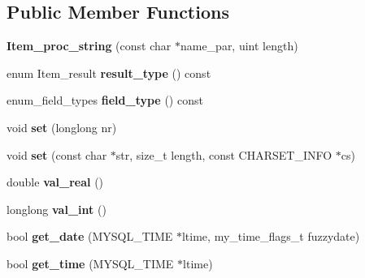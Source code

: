 \subsection*{Public Member Functions}
\begin{DoxyCompactItemize}
\item 
\mbox{\label{classItem__proc__string_a53f206b0a88f7d310efd6a93e84e3e93}} 
{\bfseries Item\+\_\+proc\+\_\+string} (const char $\ast$name\+\_\+par, uint length)
\item 
\mbox{\label{classItem__proc__string_aee3d712bd2ccdd8c4784fcc4c259ba57}} 
enum Item\+\_\+result {\bfseries result\+\_\+type} () const
\item 
\mbox{\label{classItem__proc__string_afc43c746454638a1e9e38ff055f53373}} 
enum\+\_\+field\+\_\+types {\bfseries field\+\_\+type} () const
\item 
\mbox{\label{classItem__proc__string_a5b6a04db3d2f2f30c64180e3dc791a0f}} 
void {\bfseries set} (longlong nr)
\item 
\mbox{\label{classItem__proc__string_a4b9f112a06f64b42f01827e689929f2c}} 
void {\bfseries set} (const char $\ast$str, size\+\_\+t length, const C\+H\+A\+R\+S\+E\+T\+\_\+\+I\+N\+FO $\ast$cs)
\item 
\mbox{\label{classItem__proc__string_ab64f8d38e5142872243434e5f80bdd1c}} 
double {\bfseries val\+\_\+real} ()
\item 
\mbox{\label{classItem__proc__string_a37b4b9508afcb66f67ef6ccc55f0533f}} 
longlong {\bfseries val\+\_\+int} ()
\item 
\mbox{\label{classItem__proc__string_ad72fd5e1eee4189e601b3adf57d0f5a2}} 
bool {\bfseries get\+\_\+date} (M\+Y\+S\+Q\+L\+\_\+\+T\+I\+ME $\ast$ltime, my\+\_\+time\+\_\+flags\+\_\+t fuzzydate)
\item 
\mbox{\label{classItem__proc__string_ad8d77ce35dda2eaa723b161f435b40b5}} 
bool {\bfseries get\+\_\+time} (M\+Y\+S\+Q\+L\+\_\+\+T\+I\+ME $\ast$ltime)

\end{DoxyCompactItemize}
